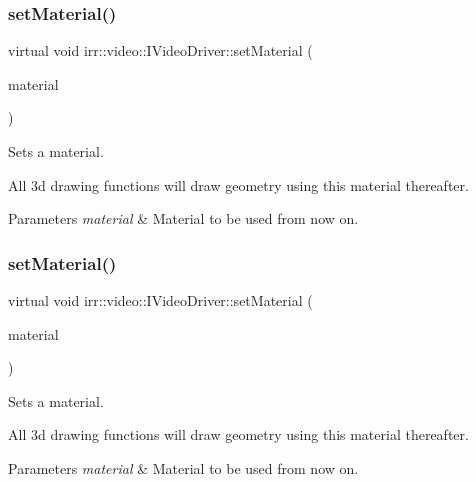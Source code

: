 \subsubsection{\texorpdfstring{set\+Material()}{setMaterial()}\hspace{0.1cm}{\footnotesize\ttfamily [1/2]}}
{\footnotesize\ttfamily virtual void irr\+::video\+::\+I\+Video\+Driver\+::set\+Material (\begin{DoxyParamCaption}\item[{const \hyperlink{classirr_1_1video_1_1SMaterial}{S\+Material} \&}]{material }\end{DoxyParamCaption})\hspace{0.3cm}{\ttfamily [pure virtual]}}



Sets a material. 

All 3d drawing functions will draw geometry using this material thereafter. 
\begin{DoxyParams}{Parameters}
{\em material} & Material to be used from now on. \\
\hline
\end{DoxyParams}
\mbox{\label{classirr_1_1video_1_1IVideoDriver_a8c9e31b41b7e6fd26cf65ce538ebab05}} 
\subsubsection{\texorpdfstring{set\+Material()}{setMaterial()}\hspace{0.1cm}{\footnotesize\ttfamily [2/2]}}
{\footnotesize\ttfamily virtual void irr\+::video\+::\+I\+Video\+Driver\+::set\+Material (\begin{DoxyParamCaption}\item[{const \hyperlink{classirr_1_1video_1_1SMaterial}{S\+Material} \&}]{material }\end{DoxyParamCaption})\hspace{0.3cm}{\ttfamily [pure virtual]}}



Sets a material. 

All 3d drawing functions will draw geometry using this material thereafter. 
\begin{DoxyParams}{Parameters}
{\em material} & Material to be used from now on. \\
\hline
\end{DoxyParams}
\mbox{\label{classirr_1_1video_1_1IVideoDriver_a4ef324ed93094f84832e8d31cf0776f2}} 
